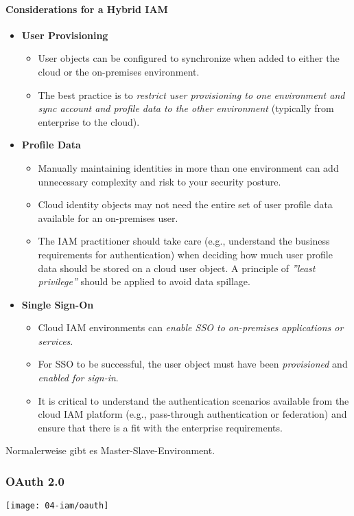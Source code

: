 \paragraph{Considerations for a Hybrid IAM}
\begin{itemize}
    \item \textbf{User Provisioning}
    \begin{itemize}
        \item User objects can be configured to synchronize when added to either the cloud or the on-premises environment.
        \item The best practice is to \textit{restrict user provisioning to one environment and sync account and profile data to the other environment} (typically from enterprise to the cloud).\\
    \end{itemize}
    \item \textbf{Profile Data}
    \begin{itemize}
        \item Manually maintaining identities in more than one environment can add unnecessary complexity and risk to your security posture.
        \item Cloud identity objects may not need the entire set of user profile data available for an on-premises user.
        \item The IAM practitioner should take care (e.g., understand the business requirements for authentication) when deciding how much user profile data should be stored on a cloud user object. A principle of \textit{''least privilege''} should be applied to avoid data spillage.\\
    \end{itemize}
    \item \textbf{Single Sign-On}
    \begin{itemize}
        \item Cloud IAM environments can \textit{enable SSO to on-premises applications or services}.
        \item For SSO to be successful, the user object must have been \textit{provisioned} and \textit{enabled for sign-in}.
        \item It is critical to understand the authentication scenarios available from the cloud IAM platform (e.g., pass-through authentication or federation) and ensure that there is a fit with the enterprise requirements.\\
    \end{itemize}
\end{itemize}

Normalerweise gibt es Master-Slave-Environment.

\subsubsection{OAuth 2.0}
\begin{center}
    \texttt{[image: 04-iam/oauth]}
    \vspace{-8pt}
\end{center}

